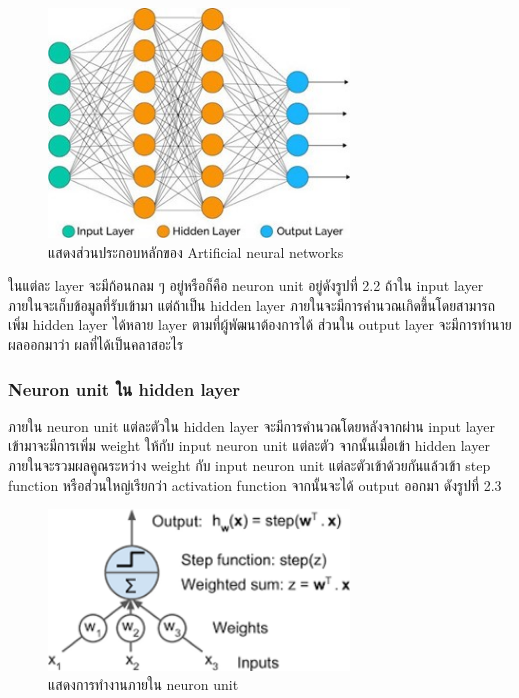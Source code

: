 \documentclass[12pt,oneside,openright,a4paper]{cpe-thai-project}
\begin{document}
\begin{figure}[!h]
  \centering
  \includegraphics[width=8cm]{./image/unit2.jpg}
  \caption{แสดงส่วนประกอบหลักของ Artificial neural networks}
  \label{fig:modelann}
\end{figure}

\par\setlength{\parindent}{5ex}
ในแต่ละ layer จะมีก้อนกลม ๆ อยู่หรือก็คือ neuron unit อยู่ดังรูปที่ 2.2 ถ้าใน input layer ภายในจะเก็บข้อมูลที่รับเข้ามา แต่ถ้าเป็น hidden layer ภายในจะมีการคำนวณเกิดขึ้นโดยสามารถเพิ่ม hidden layer ได้หลาย layer ตามที่ผู้พัฒนาต้องการได้ ส่วนใน output layer จะมีการทำนายผลออกมาว่า ผลที่ได้เป็นคลาสอะไร


\subsubsection{Neuron unit ใน hidden layer}
\par\setlength{\parindent}{5ex}
ภายใน neuron unit แต่ละตัวใน hidden layer จะมีการคำนวณโดยหลังจากผ่าน input layer เข้ามาจะมีการเพิ่ม weight ให้กับ input neuron unit แต่ละตัว จากนั้นเมื่อเข้า hidden layer ภายในจะรวมผลคูณระหว่าง weight กับ input neuron unit แต่ละตัวเข้าด้วยกันแล้วเข้า step function หรือส่วนใหญ่เรียกว่า activation function จากนั้นจะได้ output ออกมา ดังรูปที่ 2.3

\begin{figure}[!h]
  \centering
  \includegraphics[width=8cm]{./image/neuron_unit.png}
  \caption{แสดงการทำงานภายใน neuron unit \cite{geron2018neura}}
  \label{fig:modelann}
\end{figure}
\end{document}
